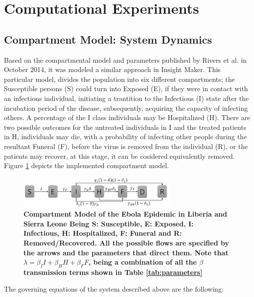 \documentclass[10pt]{article}
\begin{document}
\section{Computational Experiments}

\subsection{Compartment Model: System Dynamics}
Based on the compartmental model and parameters published by Rivers et al. in October 2014, it was modeled a similar approach in Insight Maker.  This particular model, divides the population into six different compartments; the Susceptible persons (S) could turn into Exposed (E), if they were in contact with an infections individual, initiating a trantition to the Infectious (I) state after the incubation period of the disease, subsequently, acquiring the capacity of infecting others. A percentage of the I class individuals may be Hospitalized (H). There are two possible outcomes for the untreated individuals in I and the treated patients in H, individuals may die, with a probability of infecting other people during the resultant Funeral (F), before the virus is removed from the individual (R), or the patients may recover, at this stage, it can be cosidered equivalently removed. Figure  \ref{fig:compartment} depicts the implemented compartment model. \\

\begin{figure}
  \centering
  \includegraphics[width=0.7\textwidth]{compartment}
  \caption{\bf Compartment Model of the Ebola Epidemic in Liberia and Sierra Leone \newline  Being S: Susceptible, E: Exposed, I: Infectious, H: Hospitalized, F: Funeral and R: Removed/Recovered. All the possible flows are specified by the arrows and the parameters that direct them. Note that $\lambda = \beta_{I}I+\beta_{H}H+\beta_{F}F $, being a combination of all the $\beta$ transmission terms shown in Table \ref{tab:parameters}} 
\label{fig:compartment} 
\end{figure}

 

 The governing equations of the system described above are the following: \\
\end{document}
